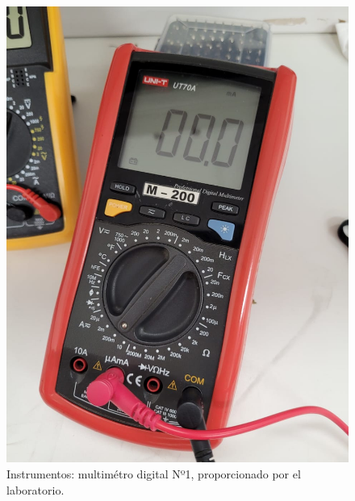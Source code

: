 \documentclass[chaptersright]{informeutn}
\begin{document}
\begin{figure}[H]
\begin{minipage}{0.3\textwidth}
            \includegraphics[width=\textwidth]{pictures/multimetro-facu.jpeg}
            \caption{Instrumentos: multimétro digital Nº1, proporcionado por el laboratorio.}
        \end{minipage}
    \end{figure}
\end{document}
